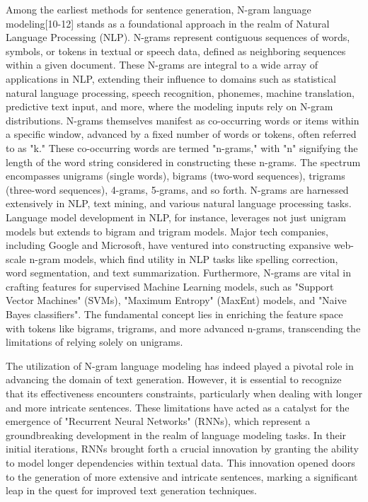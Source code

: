 \documentclass[conference]{IEEEtran}
\begin{document}
Among the earliest methods for sentence generation, N-gram language modeling[10-12] stands as a foundational approach in the realm of Natural Language Processing (NLP). N-grams represent contiguous sequences of words, symbols, or tokens in textual or speech data, defined as neighboring sequences within a given document. These N-grams are integral to a wide array of applications in NLP, extending their influence to domains such as statistical natural language processing, speech recognition, phonemes, machine translation, predictive text input, and more, where the modeling inputs rely on N-gram distributions. N-grams themselves manifest as co-occurring words or items within a specific window, advanced by a fixed number of words or tokens, often referred to as "k." These co-occurring words are termed "n-grams," with "n" signifying the length of the word string considered in constructing these n-grams. The spectrum encompasses unigrams (single words), bigrams (two-word sequences), trigrams (three-word sequences), 4-grams, 5-grams, and so forth. N-grams are harnessed extensively in NLP, text mining, and various natural language processing tasks. Language model development in NLP, for instance, leverages not just unigram models but extends to bigram and trigram models. Major tech companies, including Google and Microsoft, have ventured into constructing expansive web-scale n-gram models, which find utility in NLP tasks like spelling correction, word segmentation, and text summarization. Furthermore, N-grams are vital in crafting features for supervised Machine Learning models, such as "Support Vector Machines" (SVMs), "Maximum Entropy" (MaxEnt) models, and "Naive Bayes classifiers". The fundamental concept lies in enriching the feature space with tokens like bigrams, trigrams, and more advanced n-grams, transcending the limitations of relying solely on unigrams.




The utilization of N-gram language modeling has indeed played a pivotal role in advancing the domain of text generation. However, it is essential to recognize that its effectiveness encounters constraints, particularly when dealing with longer and more intricate sentences. These limitations have acted as a catalyst for the emergence of "Recurrent Neural Networks" (RNNs), which represent a groundbreaking development in the realm of language modeling tasks. In their initial iterations, RNNs brought forth a crucial innovation by granting the ability to model longer dependencies within textual data. This innovation opened doors to the generation of more extensive and intricate sentences, marking a significant leap in the quest for improved text generation techniques.
\end{document}
